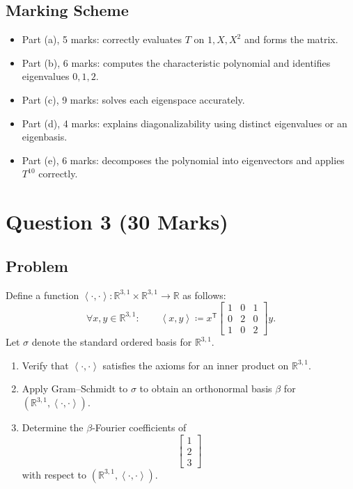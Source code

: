 \documentclass[12pt]{article}
\newcommand{\R}{\mathbb{R}}
\newcommand{\df}{\coloneqq}
\newcommand{\ip}[2]{\left\langle #1,#2\right\rangle}
\newcommand{\T}{\mathsf{T}}
\begin{document}
\newpage
\subsection{Marking Scheme}
\begin{itemize}[leftmargin=*]
  \item Part (a), 5 marks: correctly evaluates $T$ on $1,X,X^2$ and forms the matrix.
  \item Part (b), 6 marks: computes the characteristic polynomial and identifies eigenvalues $0,1,2$.
  \item Part (c), 9 marks: solves each eigenspace accurately.
  \item Part (d), 4 marks: explains diagonalizability using distinct eigenvalues or an eigenbasis.
  \item Part (e), 6 marks: decomposes the polynomial into eigenvectors and applies $T^{10}$ correctly.
\end{itemize}

\newpage
\section{Question 3 \hfill (30 Marks)}

\subsection{Problem}
Define a function $\ip{\cdot}{\cdot}:\R^{3,1}\times\R^{3,1}\to\R$ as follows:
\[
  \forall x,y\in\R^{3,1}:\qquad
  \ip{x}{y}\df x^{\T}
  \begin{bmatrix}
    1&0&1\\
    0&2&0\\
    1&0&2
  \end{bmatrix}y.
\]
Let $\sigma$ denote the standard ordered basis for $\R^{3,1}$.
\begin{enumerate}[label=(\alph*)]
  \item Verify that $\ip{\cdot}{\cdot}$ satisfies the axioms for an inner product on $\R^{3,1}$.
  \item Apply Gram--Schmidt to $\sigma$ to obtain an orthonormal basis $\beta$ for $(\R^{3,1},\ip{\cdot}{\cdot})$.
  \item Determine the $\beta$-Fourier coefficients of
  \[
    \begin{bmatrix}1\\2\\3\end{bmatrix}
  \]
  with respect to $(\R^{3,1},\ip{\cdot}{\cdot})$.
\end{enumerate}
\end{document}
